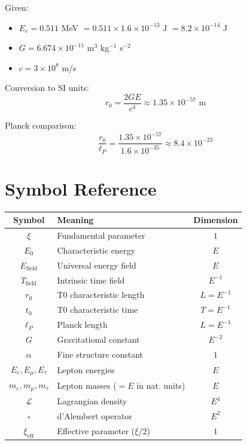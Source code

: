 	Given:
	\begin{itemize}
		\item $E_e = 0.511$ MeV $= 0.511 \times 1.6 \times 10^{-13}$ J $= 8.2 \times 10^{-14}$ J
		\item $G = 6.674 \times 10^{-11}$ m$^3$ kg$^{-1}$ s$^{-2}$
		\item $c = 3 \times 10^8$ m/s
	\end{itemize}
	
	Conversion to SI units:
	\begin{equation}
		r_0 = \frac{2GE}{c^4} \approx 1.35 \times 10^{-57} \text{ m}
	\end{equation}
	
	Planck comparison:
	\begin{equation}
		\frac{r_0}{\ell_P} = \frac{1.35 \times 10^{-57}}{1.6 \times 10^{-35}} \approx 8.4 \times 10^{-23}
	\end{equation}
	
	
	\appendix
	
	\section{Symbol Reference}
	
	\begin{longtable}{|c|l|c|}
		\hline
		\textbf{Symbol} & \textbf{Meaning} & \textbf{Dimension} \\
		\hline
		$\xi$ & Fundamental parameter & $1$ \\
		$E_0$ & Characteristic energy & $E$ \\
		$E_{\text{field}}$ & Universal energy field & $E$ \\
		$T_{\text{field}}$ & Intrinsic time field & $E^{-1}$ \\
		$r_0$ & T0 characteristic length & $L = E^{-1}$ \\
		$t_0$ & T0 characteristic time & $T = E^{-1}$ \\
		$\ell_P$ & Planck length & $L = E^{-1}$ \\
		$G$ & Gravitational constant & $E^{-2}$ \\
		$\alpha$ & Fine structure constant & $1$ \\
		$E_e, E_\mu, E_\tau$ & Lepton energies & $E$ \\
		$m_e, m_\mu, m_\tau$ & Lepton masses ($= E$ in nat. units) & $E$ \\
		$\mathcal{L}$ & Lagrangian density & $E^4$ \\
		$\square$ & d'Alembert operator & $E^2$ \\
		$\xi_{\text{eff}}$ & Effective parameter ($\xi/2$) & $1$ \\
		\hline
	\end{longtable}
	
